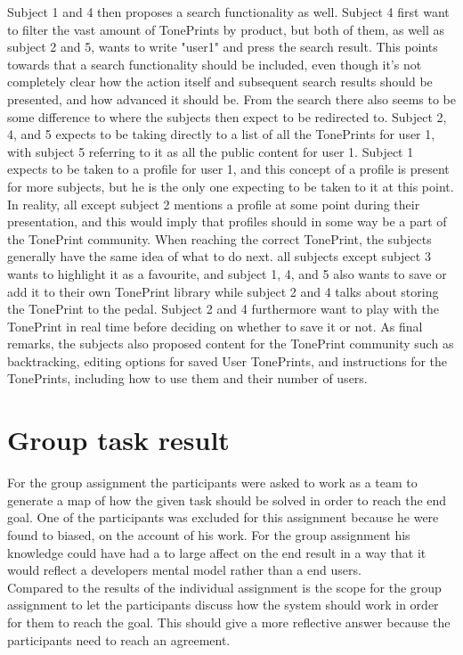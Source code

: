 Subject 1 and 4 then proposes a search functionality as well. Subject 4 first want to filter the vast amount of TonePrints by product, but both of them, as well as subject 2 and 5, wants to write "user1" and press the search result. This points towards that a search functionality should be included, even though it's not completely clear how the action itself and subsequent search results should be presented, and how advanced it should be. From the search there also seems to be some difference to where the subjects then expect to be redirected to. Subject 2, 4, and 5 expects to be taking directly to a list of all the TonePrints for user 1, with subject 5 referring to it as all the public content for user 1. Subject 1 expects to be taken to a profile for user 1, and this concept of a profile is present for more subjects, but he is the only one expecting to be taken to it at this point. In reality, all except subject 2 mentions a profile at some point during their presentation, and this would imply that profiles should in some way be a part of the TonePrint community. When reaching the correct TonePrint, the subjects generally have the same idea of what to do next. all subjects except subject 3 wants to highlight it as a favourite, and subject 1, 4, and 5 also wants to save or add it to their own TonePrint library while subject 2 and 4 talks about storing the TonePrint to the pedal. Subject 2 and 4 furthermore want to play with the TonePrint in real time before deciding on whether to save it or not. As final remarks, the subjects also proposed content for the TonePrint community such as backtracking, editing options for saved User TonePrints, and instructions for the TonePrints, including how to use them and their number of users.


\section{Group task result}
\label{GroupTaskResults}
For the group assignment the participants were asked to work as a team to generate a map of how the given task should be solved in order to reach the end goal. One of the participants was excluded for this assignment because he were found to biased, on the account of his work. For the group assignment his knowledge could have had a to large affect on the end result in a way that it would reflect a developers mental model rather than a end users.\\ 
Compared to the results of the individual assignment is the scope for the group assignment to let the participants discuss how the system should work in order for them to reach the goal. This should give a more reflective answer because the participants need to reach an agreement.\\

